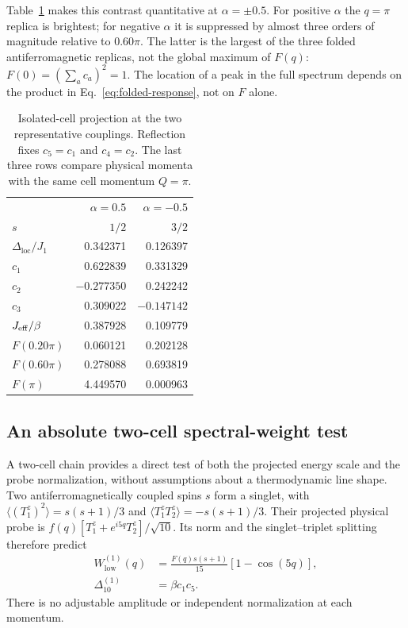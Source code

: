 Table~\ref{tab:projection} makes this contrast quantitative at
$\alpha=\pm0.5$.
For positive $\alpha$ the $q=\pi$ replica is brightest; for negative $\alpha$
it is suppressed by almost three orders of magnitude relative to $0.60\pi$.
The latter is the largest of the three folded antiferromagnetic replicas,
not the global maximum of $F(q)$: $F(0)=(\sum_ac_a)^2=1$.
The location of a peak in the full spectrum depends on the product in
Eq.~\eqref{eq:folded-response}, not on $F$ alone.

\begin{table}[!htbp]
 \caption{Isolated-cell projection at the two representative couplings.
 Reflection fixes $c_5=c_1$ and $c_4=c_2$. The last three rows compare
 physical momenta with the same cell momentum $Q=\pi$.}
 \label{tab:projection}
 \begin{ruledtabular}
 \begin{tabular}{lrr}
 & $\alpha=0.5$ & $\alpha=-0.5$\\
 $s$ & $1/2$ & $3/2$\\
 $\Delta_{\mathrm{loc}}/J_1$ & 0.342371 & 0.126397\\
 $c_1$ & 0.622839 & 0.331329\\
 $c_2$ & $-0.277350$ & 0.242242\\
 $c_3$ & 0.309022 & $-0.147142$\\
 $J_{\mathrm{eff}}/\beta$ & 0.387928 & 0.109779\\
 $F(0.20\pi)$ & 0.060121 & 0.202128\\
 $F(0.60\pi)$ & 0.278088 & 0.693819\\
 $F(\pi)$ & 4.449570 & 0.000963\\
 \end{tabular}
 \end{ruledtabular}
\end{table}

\subsection{An absolute two-cell spectral-weight test}
\label{sec:projection-benchmark}

A two-cell chain provides a direct test of both the projected energy scale
and the probe normalization, without assumptions about a thermodynamic line
shape. Two antiferromagnetically coupled spins $s$ form a singlet, with
$\langle(T_1^z)^2\rangle=s(s+1)/3$ and
$\langle T_1^zT_2^z\rangle=-s(s+1)/3$.
Their projected physical probe is
$f(q)[T_1^z+e^{i5q}T_2^z]/\sqrt{10}$.
Its norm and the singlet--triplet splitting therefore predict
\begin{align}
 W_{\mathrm{low}}^{(1)}(q)
 &=\frac{F(q)s(s+1)}{15}[1-\cos(5q)],
 \label{eq:two-cell-weight}\\
 \Delta_{10}^{(1)}&=\beta c_1c_5.
 \label{eq:two-cell-gap}
\end{align}
There is no adjustable amplitude or independent normalization at each momentum.

